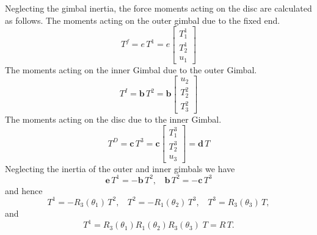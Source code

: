 \documentclass[graybox,envcountchap,sectrefs]{svmonoMuga}
\begin{document}
Neglecting the gimbal inertia, the force moments acting on the disc are calculated as follows.
The moments acting on the outer gimbal due to the fixed end.
\[
T^f = e\,T^1=e  \left[
\begin{array}{c}
T^1_1\\ T_2^1 \\ u_1
\end{array}
\right]
\]
The moments acting on the inner Gimbal due to the outer Gimbal.
\[
T^I = \mathbf{b}\,T^2=\mathbf{b} \left[
\begin{array}{c}
u_2\\ T^2_2 \\ T_3^2
\end{array}
\right]
\]
The moments acting on the disc due to the inner Gimbal.
\[
T^D = \mathbf{c}\,T^3=\mathbf{c}  \left[
\begin{array}{c}
T_1^3\\ T_2^3 \\ u_3
\end{array}
\right]=\mathbf{d}\,T
\]
Neglecting the inertia of the outer and inner gimbals we have
\[
\mathbf{e}\,T^1=-\mathbf{b}\,T^2,\:\:\:\:\mathbf{b}\,T^2=-\mathbf{c}\,T^3
\]
and hence
\begin{equation}\label{eq:GimbalMoments}
T^1=-R_3(\theta_1)\,T^2,\:\:\:\: T^2=-R_1(\theta_2)\,T^3,\:\:\:\: T^3=R_3(\theta_3)\, T,
\end{equation}
and
\[
T^1=R_3(\theta_1)R_1(\theta_2)R_3(\theta_3)\; T = R\, T.
\]
\end{document}

